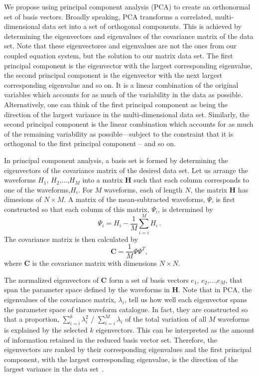 \documentclass[fleqn,usenatbib]{mnras}
\begin{document}
We propose using principal component analysis (PCA) to create an orthonormal set of basis vectors. Broadly speaking, PCA transforms a correlated, multi-dimensional data set into a set of orthogonal components. This is achieved by determining the eigenvectors and eigenvalues of the covariance matrix of the data set. Note that these eigenvectores and eigenvalues are not the ones from our coupled equation system, but the solution to our matrix data set. The first principal component is the eigenvector with the largest corresponding eigenvalue, the second principal component is the eigenvector with the next largest corresponding eigenvalue and so on. It is a linear combination of the original variables which accounts for as much of the variability in the data as possible. Alternatively, one can think of the first principal component as being the direction of the largest variance in the multi-dimensional data set. Similarly, the second principal component is the linear combination which accounts for as much of the remaining variability as possible—subject to the constraint that it is orthogonal to the first principal component – and so on.

In principal component analysis, a basis set is formed by determining the eigenvectors of the covariance matrix of the desired data set. Let us arrange the waveforms {$H_1$, $H_2$,...,$H_M$} into a matrix $\textbf{H}$ such that each column corresponds to one of the waveforms,$H_i$. For $M$ waveforms, each of length $N$, the matrix \textbf{H} has dimesions of $N \times M$. A matrix of the mean-subtracted waveforms, $\Psi$, is first constructed so that each column of this matrix, $\Psi_i$, is determined by
\begin{equation}\label{eq:1}
\Psi_i = H_i -\frac{1}{M}\sum_{i=i}^{M}H_i\,.
\end{equation}
The covariance matrix is then calculated by
\begin{equation}\label{eq:2}
\textbf{C} = \frac{1}{M}\Psi\Psi^T , 
\end{equation}
where \textbf{C} is the covariance matrix with dimensions $N \times N$.

The normalized eigenvectors of \textbf{C} form a set of basis vectors {$e_1$, $e_2$,...,$e_M$}, that span the parameter space defined by the waveforms in \textbf{H}. Note that in PCA, the eigenvalues of the covariance matrix, $\lambda_i$, tell us how well each eigenvector spans the parameter space of the waveform catalogue. In fact, they are constructed so that a proportion, $\sum_{i=i}^{k}\lambda_i^2$ / $\sum_{i=i}^{M}\lambda_i$ of
the total variation of all $M$ waveforms is explained by the selected $k$ eigenvectors. This can be interpreted as the amount of information retained in the reduced basis vector set. Therefore, the eigenvectors are ranked by their corresponding eigenvalues and the first principal component, with the largest corresponding eigenvalue, is the direction of the largest variance in the data set~\cite{}.
\end{document}
